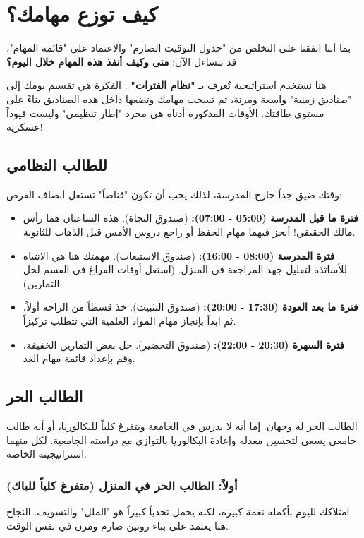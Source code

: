 \documentclass[12pt,a4paper]{book}
\begin{document}
	\section{كيف توزع مهامك؟}
	\label{sec:ideal-daily-system}
	
	بما أننا اتفقنا على التخلص من "جدول التوقيت الصارم" والاعتماد على "قائمة المهام"، قد تتساءل الآن: \textbf{متى وكيف أنفذ هذه المهام خلال اليوم؟}
	
	هنا نستخدم استراتيجية تُعرف بـ \textbf{"نظام الفترات" }. الفكرة هي تقسيم يومك إلى "صناديق زمنية" واسعة ومرنة، ثم تسحب مهامك وتضعها داخل هذه الصناديق بناءً على مستوى طاقتك. الأوقات المذكورة أدناه هي مجرد "إطار تنظيمي" وليست قيوداً عسكرية!
	\subsection{للطالب النظامي}
	وقتك ضيق جداً خارج المدرسة، لذلك يجب أن تكون "قناصاً" تستغل أنصاف الفرص:
	\begin{itemize}
		\item \textbf{فترة ما قبل المدرسة (05:00 - 07:00):} (صندوق النجاة). هذه الساعتان هما رأس مالك الحقيقي! أنجز فيهما مهام الحفظ أو راجع دروس الأمس قبل الذهاب للثانوية.
		\item \textbf{فترة المدرسة (08:00 - 16:00):} (صندوق الاستيعاب). مهمتك هنا هي الانتباه للأساتذة لتقليل جهد المراجعة في المنزل. (استغل أوقات الفراغ في القسم لحل التمارين).
		\item \textbf{فترة ما بعد العودة (17:30 - 20:00):} (صندوق التثبيت). خذ قسطاً من الراحة أولاً، ثم ابدأ بإنجاز مهام المواد العلمية التي تتطلب تركيزاً.
		\item \textbf{فترة السهرة (20:30 - 22:00):} (صندوق التحضير). حل بعض التمارين الخفيفة، وقم بإعداد قائمة مهام الغد.
	\end{itemize}
	
	\subsection{الطالب الحر}
	
	الطالب الحر له وجهان: إما أنه لا يدرس في الجامعة ويتفرغ كلياً للبكالوريا، أو أنه طالب جامعي يسعى لتحسين معدله وإعادة البكالوريا بالتوازي مع دراسته الجامعية. لكل منهما استراتيجيته الخاصة.
	
	\subsubsection{أولاً: الطالب الحر في المنزل (متفرغ كلياً للباك)}
	
	امتلاكك لليوم بأكمله نعمة كبيرة، لكنه يحمل تحدياً كبيراً هو "الملل" والتسويف. النجاح هنا يعتمد على بناء روتين صارم ومرن في نفس الوقت.
	
\end{document}
